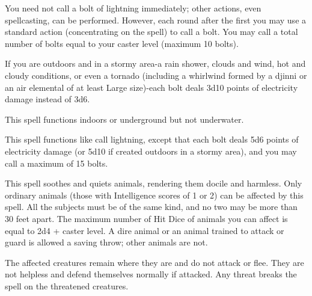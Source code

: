\begin{multicols}{2}
\begin{small}
\smallskip\noindent You need not call a bolt of lightning immediately; other actions, even spellcasting, can be performed. However, each round after the first you may use a standard action (concentrating on the spell) to call a bolt. You may call a total number of bolts equal to your caster level (maximum 10 bolts).

\smallskip\noindent If you are outdoors and in a stormy area-a rain shower, clouds and wind, hot and cloudy conditions, or even a tornado (including a whirlwind formed by a djinni or an air elemental of at least Large size)-each bolt deals 3d10 points of electricity damage instead of 3d6.

\smallskip\noindent This spell functions indoors or underground but not underwater.

\noindent This spell functions like call lightning, except that each bolt deals 5d6 points of electricity damage (or 5d10 if created outdoors in a stormy area), and you may call a maximum of 15 bolts.

\noindent This spell soothes and quiets animals, rendering them docile and harmless. Only ordinary animals (those with Intelligence scores of 1 or 2) can be affected by this spell. All the subjects must be of the same kind, and no two may be more than 30 feet apart. The maximum number of Hit Dice of animals you can affect is equal to 2d4 + caster level. A dire animal or an animal trained to attack or guard is allowed a saving throw; other animals are not.

\smallskip\noindent The affected creatures remain where they are and do not attack or flee. They are not helpless and defend themselves normally if attacked. Any threat breaks the spell on the threatened creatures.


\end{small}
\end{multicols}
